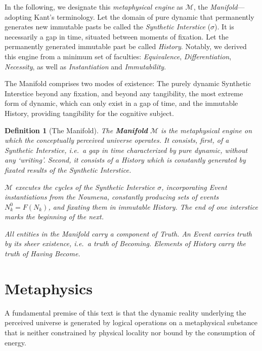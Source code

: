 \documentclass[11pt, a4paper]{article}
\theoremstyle{formalism}
\newtheorem{formalism}{Definition}
\begin{document}
In the following, we designate this {\it metaphysical engine\/} as
$\mathcal{M}$, the {\it Manifold\/}---adopting Kant's terminology. Let the
domain of pure dynamic that permanently generates new immutable pasts be called
the {\it Synthetic Interstice\/} ($\sigma$). It is necessarily a gap in time,
situated between moments of fixation. Let the permanently generated 
immutable past be called {\it History}. Notably, we derived this engine from a
minimum set of faculties: {\it Equivalence}, {\it Differentiation}, {\it
Necessity}, as well as {\it Instantiation\/} and {\it Immutability}. 

The Manifold comprises two modes of existence: The purely dynamic Synthetic
Interstice beyond any fixation, and beyond any tangibility, the most extreme
form of dynamic, which can only exist in a gap of time, and the immutable
History, providing tangibility for the cognitive subject.

\begin{formalism}[The Manifold]

    The \textbf{Manifold} $\mathcal{M}$ is the metaphysical engine on which the
    conceptually perceived universe operates. It consists, first, of a {\it
    Synthetic Interstice}, i.e.\ a gap in time characterized by pure dynamic,
    without any `writing'. Second, it consists of a History which is constantly
    generated by fixated results of the {\it Synthetic Interstice}.

    $\mathcal{M}$ executes the cycles of the Synthetic Interstice $\sigma$,
    incorporating Event instantiations from the Noumena, constantly producing
    sets of events $N^0_k = \mathit{F}(N_k)$, and fixating them in immutable
    History. The end of one interstice marks the beginning of the next.
    
    All entities in the Manifold carry a component of {\it Truth}. An Event
    carries truth by its sheer existence, i.e.\ a truth of {\it Becoming}.
    Elements of History carry the truth of {\it Having Become}.

\end{formalism}

\section{Metaphysics}

A fundamental premise of this text is that the dynamic reality underlying the
perceived universe is generated by logical operations on a metaphysical
substance that is neither constrained by physical locality nor bound by the
consumption of energy.
\end{document}
